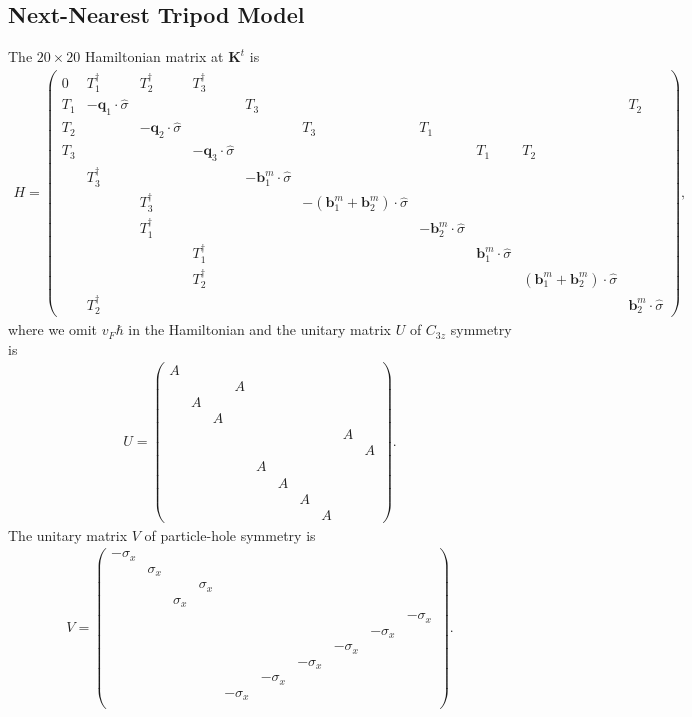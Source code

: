 \documentclass[10pt, oneside]{article}
\newcommand{\p}[1]{\left(#1\right)}
\begin{document}
\subsection{Next-Nearest Tripod Model} 
The \(20 \times 20\) Hamiltonian matrix at \(\bm{K}^{t}\) is 
\begin{align}
	H = 
	\begin{pmatrix}
		0 & T^\dagger_1 & T^\dagger_2 & T^\dagger_3 &&&&&&   \\
		T_1 & - \bm{q}_1 \cdot \hat{\sigma} &&& T_3 &&&&& T_2 \\
		T_2 && - \bm{q}_2 \cdot \hat{\sigma} &&& T_3 &  T_1 &&& \\ 
		T_3 &&& - \bm{q}_3 \cdot \hat{\sigma} &&&& T_1 & T_2 & \\
		& T^\dagger_3 &&& - \bm{b}^{m}_{1} \cdot \hat{\sigma} &&&&& \\ 
		&& T^\dagger_3 &&& - \p{\bm{b}^{m}_1 + \bm{b}^{m}_2} \cdot \hat{\sigma} &&&& \\
		&& T^\dagger_1 &&&& - \bm{b}^{m}_2 \cdot \hat{\sigma} &&&  \\
		&& & T^\dagger_1 &&&&  \bm{b}^{m}_{1} \cdot \hat{\sigma} && \\
		&&& T^\dagger_2 &&&&&  \p{\bm{b}^{m}_{1} +\bm{b}^{m}_{2}}\cdot \hat{\sigma} &  \\
		& T^\dagger_2 &&&&&&&&  \bm{b}^{m}_{2} \cdot \hat{\sigma}
	\end{pmatrix},
\end{align}
where we omit \(v_F \hbar\) in the Hamiltonian and the unitary matrix \(U\) of \(C_{3z}\) symmetry is 
\begin{align}
	U = 
	\begin{pmatrix}
		  A &&&&&&&&& \\
		  &&& A &&&&&&  \\
		  & A &&&&&&&& \\
		  && A &&&&&&& \\
		  &&&&&&&& A & \\
		  &&&&&&&&& A \\
		  &&&& A &&&&& \\
		  &&&&& A &&&& \\
		  &&&&&& A &&& \\
		  &&&&&&& A &&
	\end{pmatrix}.
\end{align}
The unitary matrix \(V\) of particle-hole symmetry is
\begin{align}
	V = \begin{pmatrix}
		-\sigma_{x} &&&&&&&&&\\	
		 & \sigma_x &&&&&&&& \\
		 &&& \sigma_x &&&&&& \\
		 && \sigma_x &&&&&&& \\
		 &&&&&&&&& -\sigma_x \\
		 &&&&&&&& -\sigma_x & \\
		 &&&&&&& -\sigma_x && \\
		 &&&&&& -\sigma_x &&& \\
		 &&&&& -\sigma_x &&&& \\
		 &&&& -\sigma_x &&&&& \\
	\end{pmatrix}.
\end{align}
\end{document}
